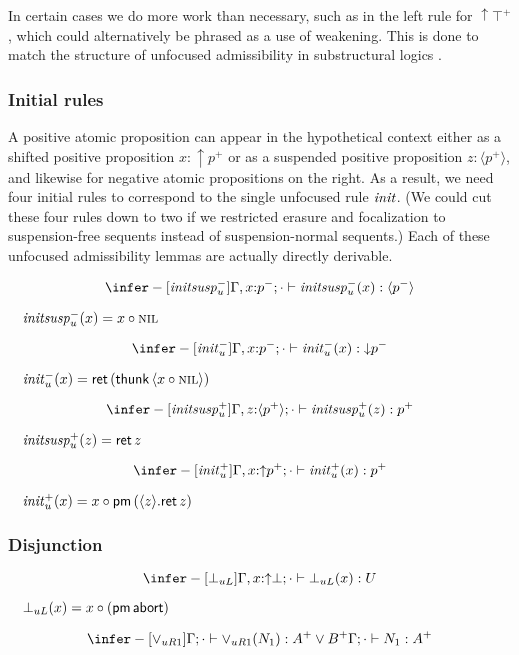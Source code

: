 \documentclass[acmtocl]{robtrans}\pdfoutput=1
\newcommand{\susp}[1]{\langle{#1}\rangle}
\newcommand{\ifoct}[4]{{#1}; {#2} \vdash {#3} : {#4} \mathstrut}
\newcommand{\dsrt}[1]{\mathsf{thunk}\,{#1}}
\newcommand{\etart}[1]{\langle{#1}\rangle} \newcommand{\etalt}[2]{\susp{#1}.{#2}}
\newcommand{\rft}[1]{\mathsf{ret}\,{#1}} \newcommand{\lft}[2]{{#1} \circ {#2}}
\begin{document}
In certain cases we do more work than necessary, such as in the left
rule for ${\uparrow}{\top^+}$, which could alternatively be phrased as
a use of weakening. This is done to match the structure of unfocused
admissibility in substructural logics \cite{simmons12substructural}.


\subsubsection{Initial rules} 

A positive atomic proposition can appear in the hypothetical context
either as a shifted positive proposition $x{:}{\uparrow}p^+$ or as a
suspended positive proposition $z{:}\susp{p^+}$, and likewise for
negative atomic propositions on the right. As a result, we need four
initial rules to correspond to the single unfocused rule ${\it init}$.
(We could cut these four rules down to two if we restricted erasure
and focalization to suspension-free sequents instead of
suspension-normal sequents.)  Each of these unfocused admissibility
lemmas are actually directly derivable.

\[
\infer-[{\it initsusp}_u^-]
{\ifoct{\Gamma, x{:}p^-}{\cdot}{{\it initsusp}_u^-(x)}{\susp{p^-}}{}}
{}
\]

$\quad{\it initsusp}_u^-(x) = \lft{x}{\textsc{nil}}$

\[
\infer-[{\it init}_u^-]
{\ifoct{\Gamma, x{:}p^-}{\cdot}{{\it init}_u^-(x)}{{\downarrow}p^-}{}}
{}
\]

$\quad{\it init}_u^-(x) = \rft{(\dsrt{\etart{\lft{x}{\textsc{nil}}}})}$

\[
\infer-[{\it initsusp}_u^+]
{\ifoct{\Gamma, z{:}\susp{p^+}}{\cdot}{{\it initsusp}_u^+(z)}{p^+}}
{}
\]

$\quad{\it initsusp}_u^+(z) = \rft{z}$

\[
\infer-[{\it init}_u^+]
{\ifoct{\Gamma, x{:}{\uparrow}p^+}{\cdot}{{\it init}_u^+(x)}{p^+}}
{}
\]

$\quad{\it init}_u^+(x) = \lft{x}{\uslt{(\etalt{z}{\rft{z}})}}$

\subsubsection{Disjunction}

\[
\infer-[\bot_{uL}]
{\ifoct{\Gamma, x{:}{\uparrow}\bot}{\cdot}{{\bot}_{uL}(x)}{U}}
{}\]

$\quad{\bot}_{uL}(x) = \lft{x}{(\uslt{\mathsf{abort}})}$

\[
\infer-[\vee_{uR1}]
{\ifoct{\Gamma}{\cdot}{\vee_{uR1}(N_1)}{A^+ \vee B^+}}
{\ifoct{\Gamma}{\cdot}{N_1}{A^+}}
\]
\end{document}

